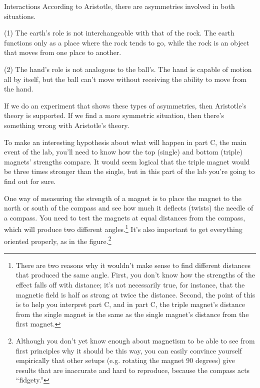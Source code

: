 \begin{lab}{Interactions}
According to Aristotle, there are asymmetries involved in both situations.

(1) The earth's role is not interchangeable with that of the
rock.  The earth functions only as a place where the rock
tends to go, while the rock is an object that moves from
one place to another.

(2) The hand's role is not analogous to the ball's.  The
hand is capable of motion all by itself, but the ball can't
move without receiving the ability to move from the hand.

If we do an experiment that shows these types of asymmetries,
then Aristotle's theory is supported.  If we find a more
symmetric situation, then there's something wrong with Aristotle's theory.

\labobservations


To make an interesting hypothesis about what will happen in
part C, the main event of the lab, you'll need to know how
the top (single) and bottom (triple) magnets' strengths
compare. It would seem logical that the triple magnet would
be three times stronger than the single, but in this part
of the lab you're going to find out for sure.


One way of measuring the strength of a magnet is to place
the magnet to the north or south of the compass and see how
much it deflects (twists) the needle of a compass. You need
to test the magnets at equal distances from the compass,
which will produce two different angles.\footnote{There are two
reasons why it wouldn't make sense to find different distances
that produced the same angle. First, you don't know how the
strengths of the effect falls off with distance; it's not necessarily
true, for instance, that the magnetic field is half as strong at
twice the distance. Second, the point of this is to help you
interpret part C, and in part C, the triple magnet's distance
from the single magnet is the same as the single magnet's distance
from the first magnet.}
It's also important to get everything oriented
properly, as in the figure.\footnote{Although you don't yet know
enough about magnetism to be able to see from first
principles why it should be this way, you can easily
convince yourself empirically that other setups (e.g.
rotating the magnet 90 degrees) give results that are
inaccurate and hard to reproduce, because the compass acts ``fidgety.''}


\end{lab}
